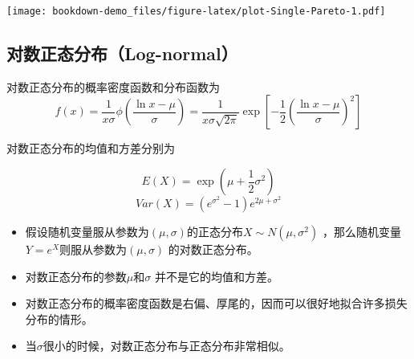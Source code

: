 \documentclass[
]{book}
\begin{document}
\texttt{[image: bookdown-demo\_files/figure-latex/plot-Single-Pareto-1.pdf]}

\hypertarget{ux5bf9ux6570ux6b63ux6001ux5206ux5e03log-normal}{%
\subsection{对数正态分布（Log-normal）}\label{ux5bf9ux6570ux6b63ux6001ux5206ux5e03log-normal}}

对数正态分布的概率密度函数和分布函数为 \[
f(x)=\frac{1}{x\sigma}\phi\left(\frac{\ln x - \mu}{\sigma}  \right)
=\frac{1}{x\sigma\sqrt{2\pi}}\exp\left[
-\frac{1}{2}\left(\frac{\ln x - \mu}{\sigma}  \right)^2
\right]
\]

对数正态分布的均值和方差分别为

\[
 E(X)=\exp\left(\mu + \frac{1}{2}\sigma^2\right)
\] \[
Var(X)=(e^{\sigma^2}-1)e^{2\mu+\sigma^2}
\]

\begin{itemize}
\item
  假设随机变量服从参数为\((\mu,\sigma)\)的正态分布\(X\sim N(\mu,\sigma^2)\) ，那么随机变量\(Y=e^X\)则服从参数为\((\mu,\sigma)\) 的对数正态分布。
\item
  对数正态分布的参数\(\mu\)和\(\sigma\) 并不是它的均值和方差。
\item
  对数正态分布的概率密度函数是右偏、厚尾的，因而可以很好地拟合许多损失分布的情形。
\item
  当\(\sigma\)很小的时候，对数正态分布与正态分布非常相似。
\end{itemize}
\end{document}

